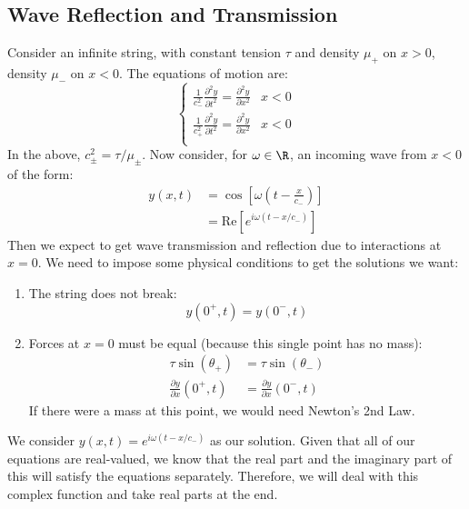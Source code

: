 \documentclass[../Main.tex]{subfiles}
\begin{document}
\subsection{Wave Reflection and Transmission}
Consider an infinite string, with constant tension $\tau$ and density $\mu_+$ on $x > 0$, density $\mu_-$ on $x < 0$. The equations of motion are:
\begin{equation*}
    \begin{cases}
        \frac{1}{c_-^2}\frac{\partial^{2}y}{\partial t^{2}} = \frac{\partial^{2}y}{\partial x^{2}} & x < 0 \\
        \frac{1}{c_+^2}\frac{\partial^{2}y}{\partial t^{2}} = \frac{\partial^{2}y}{\partial x^{2}} & x < 0 \\
    \end{cases}
\end{equation*}
In the above, $c_{\pm}^2 = \tau / \mu_{\pm}$. Now consider, for $\omega \in \R$, an incoming wave from $x < 0$ of the form:
\begin{align*}
    y(x, t) &= \cos\left[\omega \left(t - \frac{x}{c_-}\right)\right] \\
    &= \text{Re} \left[e^{i\omega(t - x/c_-)}\right]
\end{align*}
Then we expect to get wave transmission and reflection due to interactions at $x = 0$. We need to impose some physical conditions to get the solutions we want:
\begin{enumerate}
    \item The string does not break:
        \begin{equation*}
            y(0^+, t) = y(0^-, t)
        \end{equation*}
    \item Forces at $x = 0$ must be equal (because this single point has no mass):
        \begin{align*}
            \tau \sin(\theta_+) &= \tau \sin(\theta_-) \\
            \frac{\partial y}{\partial x}(0^+, t) &= \frac{\partial y}{\partial x} (0^-, t)
        \end{align*}
        If there were a mass at this point, we would need Newton's 2nd Law.
\end{enumerate}
We consider $y(x, t) = e^{i\omega (t - x / c_-)}$ as our solution. Given that all of our equations are real-valued, we know that the real part and the imaginary part of this will satisfy the equations separately. Therefore, we will deal with this complex function and take real parts at the end.
\end{document}
